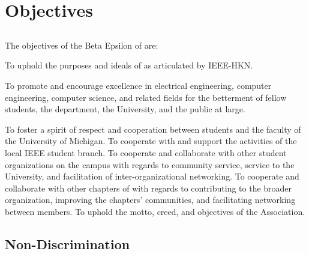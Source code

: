 \chapter{Objectives}\label{sec:objectives}
\section{}
The objectives of the Beta Epsilon of \hkn are:


\begin{enumsubsection}

\itemnotoc To uphold the purposes and ideals of \hkn as articulated by IEEE-HKN.

\itemnotoc To promote and encourage excellence in electrical engineering, computer engineering, computer science, and related fields for the betterment of fellow students, the department, the University, and the public at large.

\itemnotoc To foster a spirit of respect and cooperation between students and the faculty of the University of Michigan.
\itemnotoc To cooperate with and support the activities of the local IEEE student branch.
\itemnotoc To cooperate and collaborate with other student organizations on the campus with regards to community service, service to the University, and facilitation of inter-organizational networking.
\itemnotoc To cooperate and collaborate with other chapters of \hkn with regards to contributing to the broader organization, improving the chapters' communities, and facilitating networking between \hkn members.
\itemnotoc To uphold the motto, creed, and objectives of the Association.

\end{enumsubsection}

\section{Non-Discrimination}

